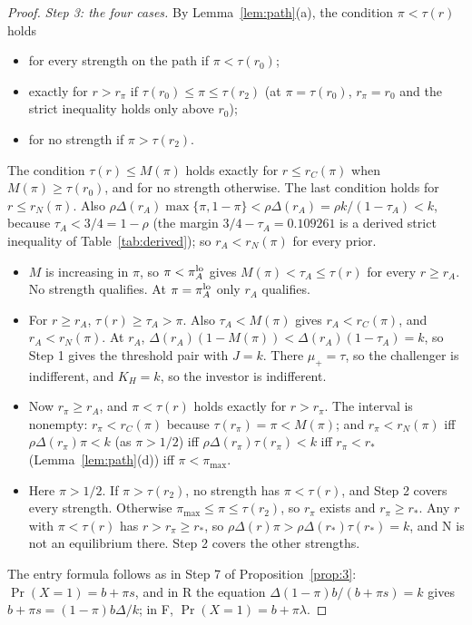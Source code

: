 \documentclass[11pt]{article}
\theoremstyle{definition}
\begin{document}
\begin{proof}
\emph{Step 3: the four cases.} By Lemma~\ref{lem:path}(a), the condition $\pi<\tau(r)$ holds
\begin{itemize}
\item for every strength on the path if $\pi<\tau(r_0)$;
\item exactly for $r>r_\pi$ if $\tau(r_0)\le\pi\le\tau(r_2)$ (at $\pi=\tau(r_0)$, $r_\pi=r_0$ and the strict
  inequality holds only above $r_0$);
\item for no strength if $\pi>\tau(r_2)$.
\end{itemize}
The condition $\tau(r)\le M(\pi)$ holds exactly for $r\le r_C(\pi)$ when $M(\pi)\ge\tau(r_0)$, and for no strength
otherwise. The last condition holds for $r\le r_N(\pi)$.
Also $\rho\Delta(r_A)\max\{\pi,1-\pi\}<\rho\Delta(r_A)=\rho k/(1-\tau_A)<k$, because $\tau_A<3/4=1-\rho$ (the margin
$3/4-\tau_A=0.109261$ is a derived strict inequality of Table~\ref{tab:derived}); so $r_A<r_N(\pi)$ for every prior.
\begin{itemize}
\item[(a)] $M$ is increasing in $\pi$, so $\pi<\pi_A^{\rm lo}$ gives $M(\pi)<\tau_A\le\tau(r)$ for every $r\ge r_A$.
  No strength qualifies. At $\pi=\pi_A^{\rm lo}$ only $r_A$ qualifies.
\item[(b)] For $r\ge r_A$, $\tau(r)\ge\tau_A>\pi$. Also $\tau_A<M(\pi)$ gives $r_A<r_C(\pi)$, and $r_A<r_N(\pi)$.
  At $r_A$, $\Delta(r_A)(1-M(\pi))<\Delta(r_A)(1-\tau_A)=k$, so Step 1 gives the threshold pair with $J=k$.
  There $\mu_+=\tau$, so the challenger is indifferent, and $K_H=k$, so the investor is indifferent.
\item[(c)] Now $r_\pi\ge r_A$, and $\pi<\tau(r)$ holds exactly for $r>r_\pi$. The interval is nonempty: $r_\pi<r_C(\pi)$
  because $\tau(r_\pi)=\pi<M(\pi)$; and $r_\pi<r_N(\pi)$ iff $\rho\Delta(r_\pi)\pi<k$ (as $\pi>1/2$) iff
  $\rho\Delta(r_\pi)\tau(r_\pi)<k$ iff $r_\pi<r_*$ (Lemma~\ref{lem:path}(d)) iff $\pi<\pi_{\max}$.
\item[(d)] Here $\pi>1/2$. If $\pi>\tau(r_2)$, no strength has $\pi<\tau(r)$, and Step 2 covers every strength.
  Otherwise $\pi_{\max}\le\pi\le\tau(r_2)$, so $r_\pi$ exists and $r_\pi\ge r_*$. Any $r$ with $\pi<\tau(r)$ has
  $r>r_\pi\ge r_*$, so $\rho\Delta(r)\pi>\rho\Delta(r_*)\tau(r_*)=k$, and N is not an equilibrium there. Step 2
  covers the other strengths.
\end{itemize}
The entry formula follows as in Step 7 of Proposition~\ref{prop:3}: $\Pr(X=1)=b+\pi s$, and in R the equation
$\Delta(1-\pi)b/(b+\pi s)=k$ gives $b+\pi s=(1-\pi)b\Delta/k$; in F, $\Pr(X=1)=b+\pi\lambda$.
\end{proof}
\end{document}
